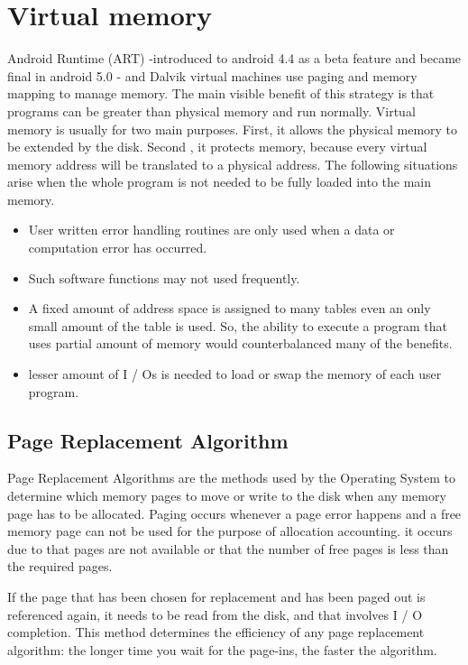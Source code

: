 \documentclass[preprint,12pt]{elsarticle}
\begin{document}
\section{\large{Virtual memory}}
Android Runtime (ART) -introduced to android 4.4 as a beta feature and became final in android 5.0 - and Dalvik virtual machines use paging and memory mapping to manage memory. 
The main visible benefit of this strategy is that programs can be greater than physical memory and run normally. Virtual memory is usually for two main purposes. First, it allows the physical memory to be extended by the disk. Second , it protects memory, because every virtual memory address will be translated to a physical address. 
The following situations arise when the whole program is not needed to be fully loaded into the main memory.\cite{7}
\begin{itemize}
\item User written error handling routines are only used when a data or computation error has occurred.
\item Such software functions may not used frequently.
\item A fixed amount of address space is assigned to many tables even an only small amount of the table is used. So, the ability to execute a program that uses partial amount of memory would counterbalanced many of the benefits. 
\item lesser amount of I / Os is needed to load or swap the memory of each user program.
\end{itemize}

\subsection{Page Replacement Algorithm}

Page Replacement Algorithms are the methods used by the Operating System to determine which memory pages to move or write to the disk when any memory page has to be allocated. Paging occurs whenever a page error happens and a free memory page can not be used for the purpose of allocation accounting. it occurs due to that pages are not available or that the number of free pages is less than the required pages. 

If the page that has been chosen for replacement and has been paged out is referenced again, it needs to be read from the disk, and that involves I / O completion. This method determines the efficiency of any page replacement algorithm: the longer time you wait for the page-ins, the faster the algorithm.
\end{document}
